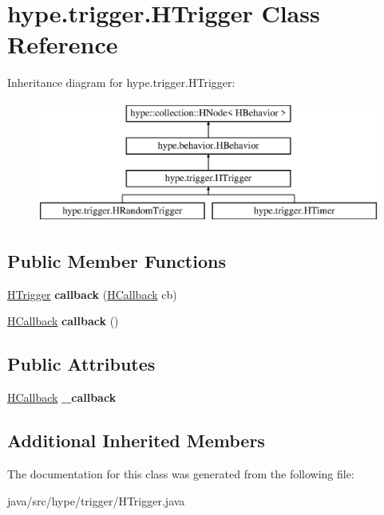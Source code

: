 \hypertarget{classhype_1_1trigger_1_1_h_trigger}{\section{hype.\-trigger.\-H\-Trigger Class Reference}
\label{classhype_1_1trigger_1_1_h_trigger}
}
Inheritance diagram for hype.\-trigger.\-H\-Trigger\-:\begin{figure}[H]
\begin{center}
\leavevmode
\includegraphics[height=4.000000cm]{classhype_1_1trigger_1_1_h_trigger}
\end{center}
\end{figure}
\subsection*{Public Member Functions}
\begin{DoxyCompactItemize}
\item 
\hypertarget{classhype_1_1trigger_1_1_h_trigger_a0f0688ac8240a2faea6c39424d158bae}{\hyperlink{classhype_1_1trigger_1_1_h_trigger}{H\-Trigger} {\bfseries callback} (\hyperlink{interfacehype_1_1interfaces_1_1_h_callback}{H\-Callback} cb)}\label{classhype_1_1trigger_1_1_h_trigger_a0f0688ac8240a2faea6c39424d158bae}

\item 
\hypertarget{classhype_1_1trigger_1_1_h_trigger_adc7385d467a6206470fe61088376b91f}{\hyperlink{interfacehype_1_1interfaces_1_1_h_callback}{H\-Callback} {\bfseries callback} ()}\label{classhype_1_1trigger_1_1_h_trigger_adc7385d467a6206470fe61088376b91f}

\end{DoxyCompactItemize}
\subsection*{Public Attributes}
\begin{DoxyCompactItemize}
\item 
\hypertarget{classhype_1_1trigger_1_1_h_trigger_a30a0463d5963b8889e47a9de32c09af8}{\hyperlink{interfacehype_1_1interfaces_1_1_h_callback}{H\-Callback} {\bfseries \-\_\-callback}}\label{classhype_1_1trigger_1_1_h_trigger_a30a0463d5963b8889e47a9de32c09af8}

\end{DoxyCompactItemize}
\subsection*{Additional Inherited Members}


The documentation for this class was generated from the following file\-:\begin{DoxyCompactItemize}
\item 
java/src/hype/trigger/H\-Trigger.\-java\end{DoxyCompactItemize}
